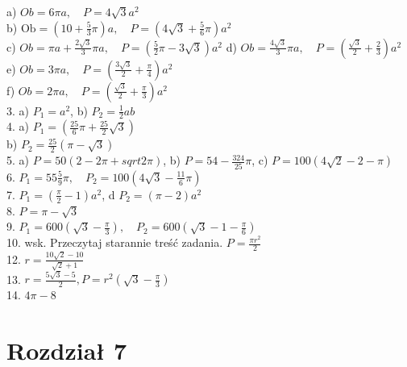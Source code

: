 \documentclass[10pt]{article}
\begin{document}
a) \(O b=6 \pi a, \quad P=4 \sqrt{3} a^{2}\)\\
b) \(\mathrm{Ob}=\left(10+\frac{5}{3} \pi\right) a, \quad P=\left(4 \sqrt{3}+\frac{5}{6} \pi\right) a^{2}\)\\
c) \(O b=\pi a+\frac{2 \sqrt{3}}{3} \pi a, \quad P=\left(\frac{5}{2} \pi-3 \sqrt{3}\right) a^{2}\) d) \(O b=\frac{4 \sqrt{3}}{3} \pi a, \quad P=\left(\frac{\sqrt{3}}{2}+\frac{2}{3}\right) a^{2}\)\\
e) \(O b=3 \pi a, \quad P=\left(\frac{3 \sqrt{3}}{2}+\frac{\pi}{4}\right) a^{2}\)\\
f) \(O b=2 \pi a, \quad P=\left(\frac{\sqrt{3}}{2}+\frac{\pi}{3}\right) a^{2}\)\\
3. a) \(P_{1}=a^{2}\), b) \(P_{2}=\frac{1}{2} a b\)\\
4. a) \(P_{1}=\left(\frac{25}{6} \pi+\frac{25}{2} \sqrt{3}\right)\)\\
b) \(P_{2}=\frac{25}{2}(\pi-\sqrt{3})\)\\
5. a) \(P=50(2-2 \pi+s q r t 2 \pi)\), b) \(P=54-\frac{324}{25} \pi\), c) \(P=100(4 \sqrt{2}-2-\pi)\)\\
6. \(P_{1}=55 \frac{5}{9} \pi, \quad P_{2}=100\left(4 \sqrt{3}-\frac{11}{6} \pi\right)\)\\
7. \(P_{1}=\left(\frac{\pi}{2}-1\right) a^{2}\), d \(P_{2}=(\pi-2) a^{2}\)\\
8. \(P=\pi-\sqrt{3}\)\\
9. \(P_{1}=600\left(\sqrt{3}-\frac{\pi}{3}\right), \quad P_{2}=600\left(\sqrt{3}-1-\frac{\pi}{6}\right)\)\\
10. wsk. Przeczytaj starannie treść zadania. \(P=\frac{\pi r^{2}}{2}\)\\
12. \(r=\frac{10 \sqrt{2}-10}{\sqrt{2}+1}\)\\
13. \(r=\frac{5 \sqrt{3}-5}{2}, P=r^{2}\left(\sqrt{3}-\frac{\pi}{3}\right)\)\\
14. \(4 \pi-8\)

\section*{Rozdział 7}
\end{document}
